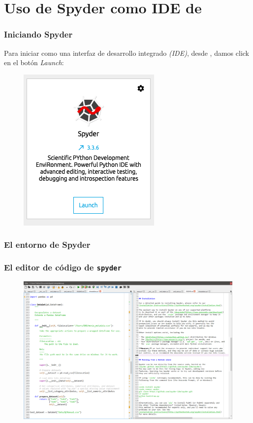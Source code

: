 \section{Uso de Spyder como IDE de \python}
\begin{frame}[fragile]
\frametitle{Iniciando Spyder}
Para iniciar  como una interfaz de desarrollo integrado \emph{(IDE)}, desde , damos click en el botón \emph{Launch}:
\begin{figure}
    \centering
    \includegraphics[scale=0.4]{spyder_01.png}
\end{figure}
\end{frame}
\begin{frame}[fragile]
\frametitle{El entorno de Spyder}
\begin{figure}
    \centering
    
\end{figure}
\end{frame}
\begin{frame}[fragile]
\frametitle{El editor de código de \texttt{spyder}}
\begin{figure}
    \centering
    \includegraphics[scale=0.15]{spyder_editor_01.png}
\end{figure}
\end{frame}
